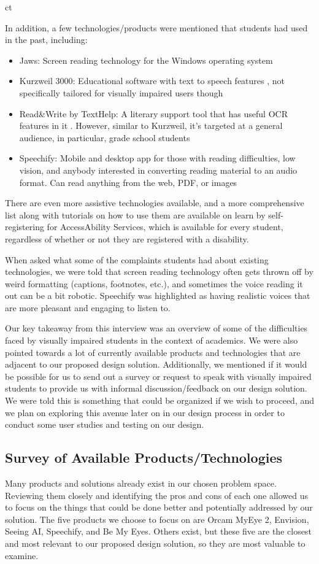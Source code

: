 ct\documentclass[a4paper,11pt]{article}
\begin{document}
In addition, a few technologies/products were mentioned that students had used in the past, including:
\begin{itemize}
    \item Jaws: Screen reading technology for the Windows operating system \cite{jaws-software}
    \item Kurzweil 3000: Educational software with text to speech features \cite{kurzweil}, not specifically tailored for visually impaired users though
    \item Read\&Write by TextHelp: A literary support tool that has useful OCR features in it \cite{read-and-write}. However, similar to Kurzweil, it's targeted at a general audience, in particular, grade school students
    \item Speechify: Mobile and desktop app for those with reading difficulties, low vision, and anybody interested in converting reading material to an audio format. Can read anything from the web, PDF, or images \cite{speechify}
\end{itemize}

There are even more assistive technologies available, and a more comprehensive list along with tutorials on how to use them are available on learn by self-registering for AccessAbility Services, which is available for every student, regardless of whether or not they are registered with a disability.

When asked what some of the complaints students had about existing technologies, we were told that screen reading technology often gets thrown off by weird formatting (captions, footnotes, etc.), and sometimes the voice reading it out can be a bit robotic. Speechify was highlighted as having realistic voices that are more pleasant and engaging to listen to.

Our key takeaway from this interview was an overview of some of the difficulties faced by visually impaired students in the context of academics. We were also pointed towards a lot of currently available products and technologies that are adjacent to our proposed design solution. Additionally, we mentioned if it would be possible for us to send out a survey or request to speak with visually impaired students to provide us with informal discussion/feedback on our design solution. We were told this is something that could be organized if we wish to proceed, and we plan on exploring this avenue later on in our design process in order to conduct some user studies and testing on our design.

\subsection{Survey of Available Products/Technologies}
Many products and solutions already exist in our chosen problem space. Reviewing them closely and identifying the pros and cons of each one allowed us to focus on the things that could be done better and potentially addressed by our solution. The five products we choose to focus on are Orcam MyEye 2, Envision, Seeing AI, Speechify, and Be My Eyes. Others exist, but these five are the closest and most relevant to our proposed design solution, so they are most valuable to examine.
\end{document}
